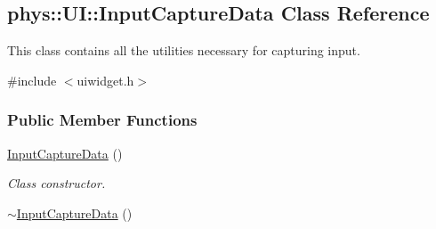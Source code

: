 \hypertarget{classphys_1_1UI_1_1InputCaptureData}{
\subsection{phys::UI::InputCaptureData Class Reference}
\label{d3/df0/classphys_1_1UI_1_1InputCaptureData}
}


This class contains all the utilities necessary for capturing input.  




{\ttfamily \#include $<$uiwidget.h$>$}

\subsubsection*{Public Member Functions}
\begin{DoxyCompactItemize}
\item 
\hypertarget{classphys_1_1UI_1_1InputCaptureData_a3880b8daa9662bc5c117343040661563}{
\hyperlink{classphys_1_1UI_1_1InputCaptureData_a3880b8daa9662bc5c117343040661563}{InputCaptureData} ()}
\label{d3/df0/classphys_1_1UI_1_1InputCaptureData_a3880b8daa9662bc5c117343040661563}

\begin{DoxyCompactList}\small\item\em Class constructor. \item\end{DoxyCompactList}\item 
\hypertarget{classphys_1_1UI_1_1InputCaptureData_a7bd115ce3c6ab7e3a886c26ea99407a5}{
\hyperlink{classphys_1_1UI_1_1InputCaptureData_a7bd115ce3c6ab7e3a886c26ea99407a5}{$\sim$InputCaptureData} ()}
\label{d3/df0/classphys_1_1UI_1_1InputCaptureData_a7bd115ce3c6ab7e3a886c26ea99407a5}


\end{DoxyCompactItemize}
